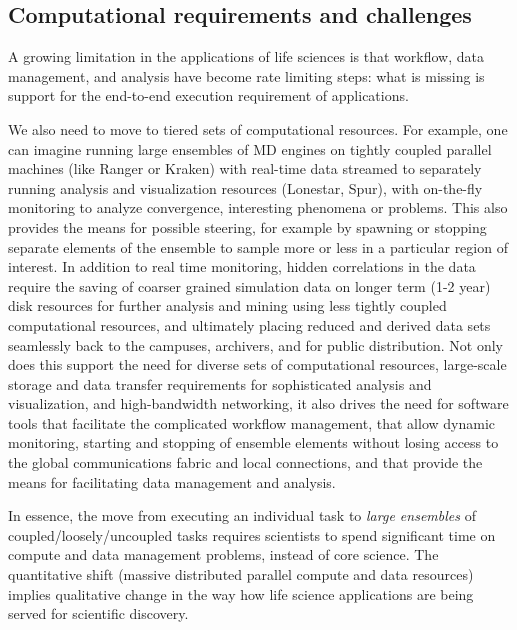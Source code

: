 \documentclass{sig-alternate}
\begin{document}
\subsection{Computational requirements and challenges}

A growing limitation in the applications of life sciences is that workflow, data management, and
analysis have become rate limiting steps: what is missing is support for the end-to-end execution requirement of applications.

We also need to move to tiered sets of computational resources.  For
example, one can imagine running large ensembles of MD engines on
tightly coupled parallel machines (like Ranger or Kraken) with
real-time data streamed to separately running analysis and
visualization resources (Lonestar, Spur), with on-the-fly monitoring
to analyze convergence, interesting phenomena or problems.  This also
provides the means for possible steering, for example by spawning or
stopping separate elements of the ensemble to sample more or less in a
particular region of interest.  In addition to real time monitoring,
hidden correlations in the data require the saving of coarser grained
simulation data on longer term (1-2 year) disk resources for further
analysis and mining using less tightly coupled computational
resources, and ultimately placing reduced and derived data sets
seamlessly back to the campuses, archivers, and for public
distribution.  Not only does this support the need for diverse sets of
computational resources, large-scale storage and data transfer
requirements for sophisticated analysis and visualization, and
high-bandwidth networking, it also drives the need for software tools
that facilitate the complicated workflow management, that allow
dynamic monitoring, starting and stopping of ensemble elements without
losing access to the global communications fabric and local
connections, and that provide the means for facilitating data
management and analysis.

In essence, the move from executing an individual task to \textit{large
  ensembles} of coupled/loosely/uncoupled tasks requires scientists to spend
significant time on compute and data management problems, instead of
core science.  The quantitative shift (massive distributed parallel
compute and data resources) implies qualitative change in the way how life science applications are being served for scientific discovery. 

\end{document}
